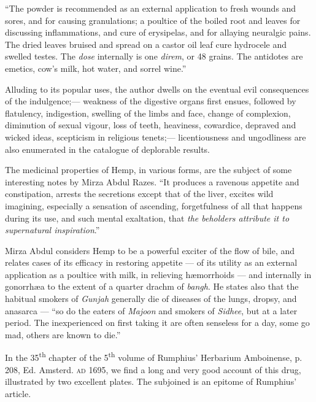 \documentclass[a4paper, 11pt, oneside, polutonikogreek, english]{article}
\begin{document}
``The powder is recommended as an external application to fresh wounds and sores, and for causing granulations; a poultice of the boiled root and leaves for discussing inflammations, and cure of erysipelas, and for allaying neuralgic pains. The dried leaves bruised and spread on a castor oil leaf cure hydrocele and swelled testes. The \emph{dose} internally is one \emph{direm}, or 48 grains. The antidotes are emetics, cow's milk, hot water, and sorrel wine.''

Alluding to its popular uses, the author dwells on the eventual evil consequences of the indulgence;--- weakness of the digestive organs first ensues, followed by flatulency, indigestion, swelling of the limbs and face, change of complexion, diminution of sexual vigour, loss of teeth, heaviness, cowardice, depraved and wicked ideas, scepticism in religious tenets;--- licentiousness and ungodliness are also enumerated in the catalogue of deplorable results.

The medicinal properties of Hemp, in various forms, are the subject of some interesting notes by Mirza Abdul Razes. ``It produces a ravenous appetite and constipation, arrests the secretions except that of the liver, excites wild imagining, especially a sensation of ascending, forgetfulness of all that happens during its use, and such mental exaltation, that \emph{the beholders attribute it to supernatural inspiration}.''

Mirza Abdul considers Hemp to be a powerful exciter of the flow of bile, and relates cases of its efficacy in restoring appetite --- of its utility as an external application as a poultice with milk, in relieving hæmorrhoids --- and internally in gonorrhæa to the extent of a quarter drachm of \emph{bangh}. He states also that the habitual smokers of \emph{Gunjah} generally die of diseases of the lungs, dropsy, and anasarca --- ``so do the eaters of \emph{Majoon} and smokers of \emph{Sidhee}, but at a later period. The inexperienced on first taking it are often senseless for a day, some go mad, others are known to die.''

In the 35\textsuperscript{th} chapter of the 5\textsuperscript{th} volume of Rumphius' Herbarium Amboinense, p. 208, Ed. Amsterd. \textsc{ad} 1695, we find a long and very good account of this drug, illustrated by two excellent plates. The subjoined is an epitome of Rumphius' article.
\end{document}
